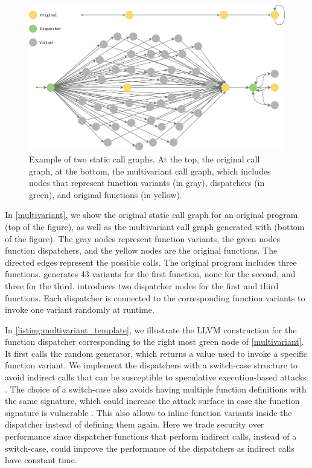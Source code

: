 \begin{figure}
    \centering
  \includegraphics[width=.8\linewidth]{diagrams/CFG.png}
  \caption{Example of two static call graphs. At the top, the original call graph, at the bottom, the multivariant call graph, which includes nodes that represent function variants (in gray), dispatchers (in green), and original functions  (in yellow).
}
  \label{multivariant}
\end{figure}

In \autoref{multivariant}, we show the original static call graph for an original program (top of the figure), as well as the multivariant call graph generated with \tool (bottom of the figure).
The gray nodes represent function variants, the green nodes function dispatchers, and the yellow nodes are the original functions.
The directed edges represent the possible calls.
The original program includes three functions. \tool generates 43 variants for the first function, none for the second, and three for the third. 
\tool introduces two dispatcher nodes for the first and third functions. Each dispatcher is connected to the corresponding function variants to invoke one variant randomly at runtime.


In  \autoref{listing:multivariant_template}, we illustrate the LLVM construction for the function dispatcher corresponding to the right most green node of \autoref{multivariant}.
It first calls the random generator, which returns a value used to invoke a specific function variant. 
We implement the dispatchers with a switch-case structure to avoid indirect calls that can be susceptible to speculative execution-based attacks \cite{Narayan2021Swivel}. 
The choice of a switch-case also avoids having multiple function definitions with the same signature, which could increase the attack surface in case the function signature is vulnerable \cite{johnson2021}.
This also allows \tool to inline function variants inside the dispatcher instead of defining them again.
Here we trade security over performance since dispatcher functions that perform indirect calls, instead of a switch-case,  could improve the performance of the dispatchers as indirect calls have constant time.


